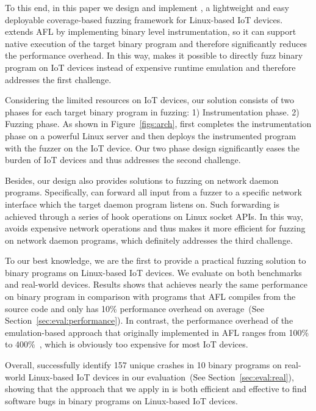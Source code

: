 To this end, in this paper we design and implement \sysname, a lightweight and easy deployable coverage-based fuzzing framework for Linux-based IoT devices. \sysname extends AFL by implementing binary level instrumentation, so it can support native execution of the target binary program and therefore significantly reduces the performance overhead. In this way, \sysname makes it possible to directly fuzz binary program on IoT devices instead of expensive runtime emulation and therefore addresses the first challenge.

Considering the limited resources on IoT devices, our solution consists of two phases for each target binary program in fuzzing: 1) Instrumentation phase. 2) Fuzzing phase. As shown in Figure~\ref{figs:arch}, \sysname first completes the instrumentation phase on a powerful Linux server and then deploys the instrumented program with the fuzzer on the IoT device. Our two phase design significantly eases the burden of IoT devices and thus addresses the second challenge.   


Besides, our design also provides solutions to fuzzing on network daemon programs. Specifically, \sysname can forward all input from a fuzzer to a specific network interface which the target daemon program listens on. Such forwarding is achieved through a series of hook operations on Linux socket APIs. In this way, \sysname avoids expensive network operations and thus makes it more efficient for fuzzing on network daemon programs, which definitely addresses the third challenge.

To our best knowledge, we are the first to provide a practical fuzzing solution to binary programs on Linux-based IoT devices. We evaluate \sysname on both benchmarks and real-world devices. Results shows that \sysname achieves nearly the same performance on binary program in comparison with programs that AFL compiles from the source code and only has 10\% performance overhead on average~(See Section~\ref{sec:eval:performance}). In contrast, the performance overhead of the emulation-based approach that originally implemented in AFL ranges from 100\% to 400\%~\cite{aflreadme}, which is obviously too expensive for most IoT devices. 

Overall, \sysname successfully identify 157 unique crashes in 10 binary programs on real-world Linux-based IoT devices in our evaluation~(See Section~\ref{sec:eval:real}), showing that the approach that we apply in \sysname is both efficient and effective to find software bugs in binary programs on Linux-based IoT devices. 

